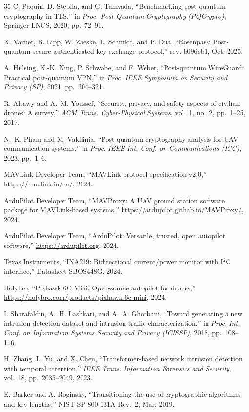\documentclass[conference]{IEEEtran}
\begin{document}
\begin{thebibliography}{35}
C. Paquin, D. Stebila, and G. Tamvada, ``Benchmarking post-quantum cryptography in TLS,'' in \emph{Proc. Post-Quantum Cryptography (PQCrypto)}, Springer LNCS, 2020, pp.~72--91.

K. Varner, B. Lipp, W. Zaeske, L. Schmidt, and P. Dua, ``Rosenpass: Post-quantum-secure authenticated key exchange protocol,'' rev. b096cb1, Oct. 2025.

A. H{\"u}lsing, K.-K. Ning, P. Schwabe, and F. Weber, ``Post-quantum WireGuard: Practical post-quantum VPN,'' in \emph{Proc. IEEE Symposium on Security and Privacy (SP)}, 2021, pp.~304--321.

R. Altawy and A.~M. Youssef, ``Security, privacy, and safety aspects of civilian drones: A survey,'' \emph{ACM Trans. Cyber-Physical Systems}, vol.~1, no.~2, pp.~1--25, 2017.

N.~K. Pham and M. Vakilinia, ``Post-quantum cryptography analysis for UAV communication systems,'' in \emph{Proc. IEEE Int. Conf. on Communications (ICC)}, 2023, pp.~1--6.

MAVLink Developer Team, ``MAVLink protocol specification v2.0,'' \url{https://mavlink.io/en/}, 2024.

ArduPilot Developer Team, ``MAVProxy: A UAV ground station software package for MAVLink-based systems,'' \url{https://ardupilot.github.io/MAVProxy/}, 2024.

ArduPilot Developer Team, ``ArduPilot: Versatile, trusted, open autopilot software,'' \url{https://ardupilot.org}, 2024.

Texas Instruments, ``INA219: Bidirectional current/power monitor with I$^2$C interface,'' Datasheet SBOS448G, 2024.

Holybro, ``Pixhawk 6C Mini: Open-source autopilot for drones,'' \url{https://holybro.com/products/pixhawk-6c-mini}, 2024.

I. Sharafaldin, A.~H. Lashkari, and A.~A. Ghorbani, ``Toward generating a new intrusion detection dataset and intrusion traffic characterization,'' in \emph{Proc. Int. Conf. on Information Systems Security and Privacy (ICISSP)}, 2018, pp.~108--116.

H. Zhang, L. Yu, and X. Chen, ``Transformer-based network intrusion detection with temporal attention,'' \emph{IEEE Trans. Information Forensics and Security}, vol.~18, pp.~2035--2049, 2023.

E. Barker and A. Roginsky, ``Transitioning the use of cryptographic algorithms and key lengths,'' NIST SP 800-131A Rev.~2, Mar. 2019.

\end{thebibliography}
\end{document}
